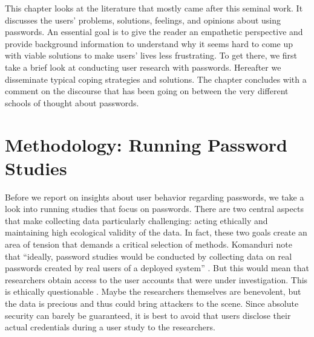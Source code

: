 This chapter looks at the literature that mostly came after this seminal work. It discusses the users' problems, solutions, feelings, and opinions about using passwords. An essential goal is to give the reader an empathetic perspective and provide background information to understand why it seems hard to come up with viable solutions to make users' lives less frustrating. To get there, we first take a brief look at conducting user research with passwords. Hereafter we disseminate typical coping strategies and solutions. The chapter concludes with a comment on the discourse that has been going on between the very different schools of thought about passwords. 





\section{Methodology: Running Password Studies}\label{sec:rw:methodology}
Before we report on insights about user behavior regarding passwords, we take a look into running studies that focus on passwords. There are two central aspects that make collecting data particularly challenging: acting ethically and maintaining high ecological validity of the data. In fact, these two goals create an area of tension that demands a critical selection of methods. Komanduri \etal note that ``ideally, password studies would be conducted by collecting data on real passwords created by real users of a deployed system'' \cite{Komanduri2011OfPasswordsAndPeople}. But this would mean that researchers obtain access to the user accounts that were under investigation. This is ethically questionable \cite{Egelman2012ItsNotStealing}. Maybe the researchers themselves are benevolent, but the data is precious and thus could bring attackers to the scene. Since absolute security can barely be guaranteed, it is best to avoid that users disclose their actual credentials during a user study to the researchers.

